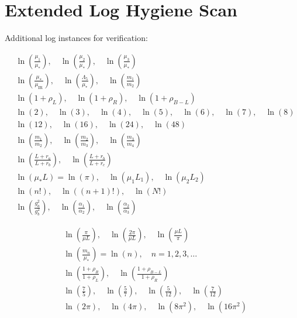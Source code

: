 \documentclass[11pt,a4paper]{article}
\theoremstyle{definition}
\begin{document}
\appendix
\section{Extended Log Hygiene Scan}
\label{app:log_scan}

Additional log instances for verification:

\begin{align}
\label{eq:log_ext_1}
&\ln\left(\frac{\mu_1}{\mu_*}\right), \quad \ln\left(\frac{\mu_2}{\mu_*}\right), \quad \ln\left(\frac{\mu_3}{\mu_*}\right) \\
\label{eq:log_ext_2}
&\ln\left(\frac{\mu_*}{\mu_{\text{IR}}}\right), \quad \ln\left(\frac{\Lambda_5}{\mu_*}\right), \quad \ln\left(\frac{m_1}{m_2}\right) \\
\label{eq:log_ext_3}
&\ln(1 + \rho_L), \quad \ln(1 + \rho_R), \quad \ln(1 + \rho_{B-L}) \\
\label{eq:log_ext_4}
&\ln(2), \quad \ln(3), \quad \ln(4), \quad \ln(5), \quad \ln(6), \quad \ln(7), \quad \ln(8) \\
\label{eq:log_ext_5}
&\ln(12), \quad \ln(16), \quad \ln(24), \quad \ln(48) \\
\label{eq:log_ext_6}
&\ln\left(\frac{m_1}{m_2}\right), \quad \ln\left(\frac{m_2}{m_3}\right), \quad \ln\left(\frac{m_3}{m_4}\right) \\
\label{eq:log_ext_7}
&\ln\left(\frac{L + r_a}{L + r_b}\right), \quad \ln\left(\frac{L + r_b}{L + r_c}\right) \\
\label{eq:log_ext_8}
&\ln(\mu_* L) = \ln(\pi), \quad \ln(\mu_1 L_1), \quad \ln(\mu_2 L_2) \\
\label{eq:log_ext_9}
&\ln(n!), \quad \ln((n+1)!), \quad \ln(N!) \\
\label{eq:log_ext_10}
&\ln\left(\frac{g_a^2}{g_b^2}\right), \quad \ln\left(\frac{\alpha_1}{\alpha_2}\right), \quad \ln\left(\frac{\alpha_2}{\alpha_3}\right)
\end{align}

\begin{align}
\label{eq:log_ext_11}
&\ln\left(\frac{\pi}{\mu L}\right), \quad \ln\left(\frac{2\pi}{\mu L}\right), \quad \ln\left(\frac{\mu L}{\pi}\right) \\
\label{eq:log_ext_12}
&\ln\left(\frac{m_n}{\mu_*}\right) = \ln(n), \quad n = 1, 2, 3, \ldots \\
\label{eq:log_ext_13}
&\ln\left(\frac{1 + \rho_R}{1 + \rho_L}\right), \quad \ln\left(\frac{1 + \rho_{B-L}}{1 + \rho_R}\right) \\
\label{eq:log_ext_14}
&\ln\left(\frac{7}{5}\right), \quad \ln\left(\frac{5}{7}\right), \quad \ln\left(\frac{5}{12}\right), \quad \ln\left(\frac{7}{12}\right) \\
\label{eq:log_ext_15}
&\ln(2\pi), \quad \ln(4\pi), \quad \ln(8\pi^2), \quad \ln(16\pi^2)
\end{align}
\end{document}
